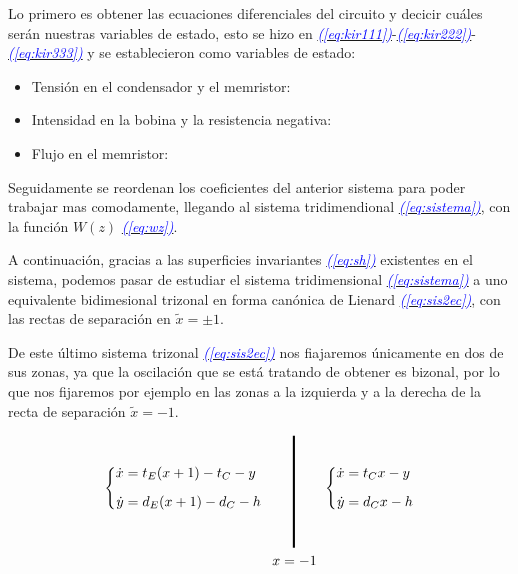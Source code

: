 \documentclass[12pt,a4paper]{report} %
\newcommand{\eref}[1]{\hyperref[#1]{\textcolor{blue}{\textit{(\ref*{#1})}}}}
\begin{document}
	\vspace{0.5cm} Lo primero es obtener las ecuaciones diferenciales del circuito y decicir cuáles serán nuestras variables de estado, esto se hizo en \eref{eq:kir111}-\eref{eq:kir222}-\eref{eq:kir333} y se establecieron como variables de estado:
	
	\begin{itemize}
		\item Tensión en el condensador y el memristor: 
		\item Intensidad en la bobina y la resistencia negativa: 
		\item Flujo en el memristor: 
	\end{itemize}
	
	\vspace{0.5cm} Seguidamente se reordenan los coeficientes del anterior sistema para poder trabajar mas comodamente, llegando al sistema tridimendional \eref{eq:sistema}, con la función $W(z)$ \eref{eq:wz}.
	
	\vspace{0.5cm} A continuación, gracias a las superficies invariantes \eref{eq:sh} existentes en el sistema, podemos pasar de estudiar el sistema tridimensional \eref{eq:sistema} a uno equivalente bidimesional trizonal en forma canónica de Lienard \eref{eq:sis2ec}, con las rectas de separación en $\tilde{x}=\pm1$.
	
	\vspace{0.5cm} De este último sistema trizonal \eref{eq:sis2ec} nos fiajaremos únicamente en dos de sus zonas, ya que la oscilación que se está tratando de obtener es bizonal, por lo que nos fijaremos por ejemplo en las zonas a la izquierda y a la derecha de la recta de separación $\tilde{x}=-1$.
	
	\begin{equation}
		\label{eq:sisbiz}
		\begin{gathered}
			\left\{
			\begin{aligned}
				\dot{x}&=t_E(x+1)-t_C-y
				\\[2mm]
				\dot{y}&=d_E(x+1)-d_C-h
			\end{aligned}
			\right. \qquad 
			\rule[-40pt]{1.5pt}{80pt} \qquad 
			\left\{
			\begin{aligned}
				\dot{x}&=t_Cx-y
				\\[2mm]
				\dot{y}&=d_Cx-h
			\end{aligned}
			\right. \\ \quad\qquad\qquad x=-1
		\end{gathered}
	\end{equation}\smallskip
	
\end{document}

